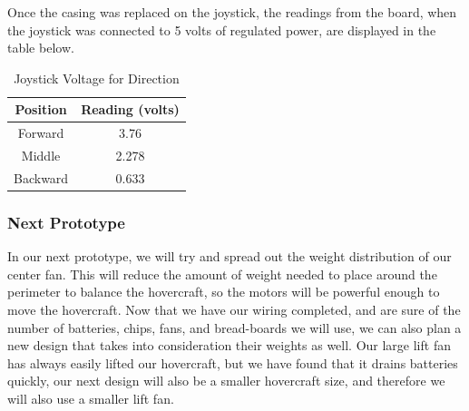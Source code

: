 Once the casing was replaced on the joystick, the readings from the board, when the joystick was connected to 5 volts of regulated power, are displayed in the table below.

\begin{table}
\caption{Joystick Voltage for Direction}
\begin{center}
\begin{tabular}{ c c }
  Position & Reading (volts) \\
  \hline
  Forward & 3.76 \\
  Middle & 2.278 \\
  Backward & 0.633 \\
\end{tabular}
\end{center}
\label{voltagePotentiometerTable}
\end{table}

\subsubsection{Next Prototype}
In our next prototype, we will try and spread out the weight distribution of our center fan. This will reduce the amount of weight needed to place around the perimeter to balance the hovercraft, so the motors will be powerful enough to move the hovercraft. Now that we have our wiring completed, and are sure of the number of batteries, chips, fans, and bread-boards we will use, we can also plan a new design that takes into consideration their weights as well. Our large lift fan has always easily lifted our hovercraft, but we have found that it drains batteries quickly, our next design will also be a smaller hovercraft size, and therefore we will also use a smaller lift fan.